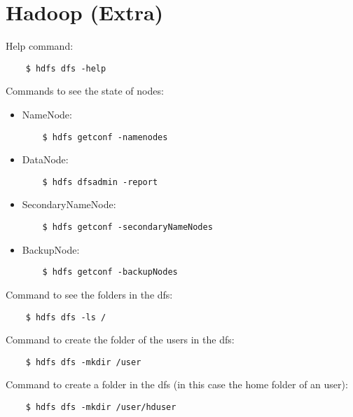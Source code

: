 \section{Hadoop (Extra)}


Help command:

\begin{lstlisting}
    $ hdfs dfs -help
\end{lstlisting}


Commands to see the state of nodes:

\begin{itemize}

\item NameNode:

\begin{lstlisting}
    $ hdfs getconf -namenodes
\end{lstlisting}

\item DataNode:

\begin{lstlisting}
    $ hdfs dfsadmin -report
\end{lstlisting}

\item SecondaryNameNode:

\begin{lstlisting}
    $ hdfs getconf -secondaryNameNodes
\end{lstlisting}

\item BackupNode:

\begin{lstlisting}
    $ hdfs getconf -backupNodes
\end{lstlisting}

\end{itemize}


Command to see the folders in the dfs:

\begin{lstlisting}
    $ hdfs dfs -ls /
\end{lstlisting}


Command to create the folder of the users in the dfs:

\begin{lstlisting}
    $ hdfs dfs -mkdir /user
\end{lstlisting}


Command to create a folder in the dfs (in this case the home folder of an user):

\begin{lstlisting}
    $ hdfs dfs -mkdir /user/hduser
\end{lstlisting}


